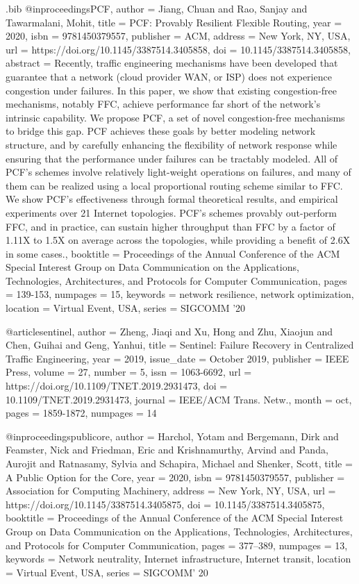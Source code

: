 \documentclass[sigconf]{acmart}
\begin{document}
\begin{filecontents}{\jobname.bib}
@inproceedings{PCF, author = {Jiang, Chuan and Rao, Sanjay and Tawarmalani, Mohit}, title = {PCF: Provably Resilient Flexible Routing}, year = {2020}, isbn = {9781450379557}, publisher = {ACM}, address = {New York, NY, USA}, url = {https://doi.org/10.1145/3387514.3405858}, doi = {10.1145/3387514.3405858}, abstract = {Recently, traffic engineering mechanisms have been developed that guarantee that a network (cloud provider WAN, or ISP) does not experience congestion under failures. In this paper, we show that existing congestion-free mechanisms, notably FFC, achieve performance far short of the network's intrinsic capability. We propose PCF, a set of novel congestion-free mechanisms to bridge this gap. PCF achieves these goals by better modeling network structure, and by carefully enhancing the flexibility of network response while ensuring that the performance under failures can be tractably modeled. All of PCF's schemes involve relatively light-weight operations on failures, and many of them can be realized using a local proportional routing scheme similar to FFC. We show PCF's effectiveness through formal theoretical results, and empirical experiments over 21 Internet topologies. PCF's schemes provably out-perform FFC, and in practice, can sustain higher throughput than FFC by a factor of 1.11X to 1.5X on average across the topologies, while providing a benefit of 2.6X in some cases.}, booktitle = {Proceedings of the Annual Conference of the ACM Special Interest Group on Data Communication on the Applications, Technologies, Architectures, and Protocols for Computer Communication}, pages = {139-153}, numpages = {15}, keywords = {network resilience, network optimization}, location = {Virtual Event, USA}, series = {SIGCOMM '20} }
 
 
 @article{sentinel, author = {Zheng, Jiaqi and Xu, Hong and Zhu, Xiaojun and Chen, Guihai and Geng, Yanhui}, title = {Sentinel: Failure Recovery in Centralized Traffic Engineering}, year = {2019}, issue_date = {October 2019}, publisher = {IEEE Press}, volume = {27}, number = {5}, issn = {1063-6692}, url = {https://doi.org/10.1109/TNET.2019.2931473}, doi = {10.1109/TNET.2019.2931473}, journal = {IEEE/ACM Trans. Netw.}, month = oct, pages = {1859-1872}, numpages = {14} }
 
 @inproceedings{publicore, author = {Harchol, Yotam and Bergemann, Dirk and Feamster, Nick and Friedman, Eric and Krishnamurthy, Arvind and Panda, Aurojit and Ratnasamy, Sylvia and Schapira, Michael and Shenker, Scott}, title = {A Public Option for the Core}, year = {2020}, isbn = {9781450379557}, publisher = {Association for Computing Machinery}, address = {New York, NY, USA}, url = {https://doi.org/10.1145/3387514.3405875}, doi = {10.1145/3387514.3405875}, booktitle = {Proceedings of the Annual Conference of the ACM Special Interest Group on Data Communication on the Applications, Technologies, Architectures, and Protocols for Computer Communication}, pages = {377–389}, numpages = {13}, keywords = {Network neutrality, Internet infrastructure, Internet transit}, location = {Virtual Event, USA}, series = {SIGCOMM' 20} }


\end{filecontents}
\end{document}
